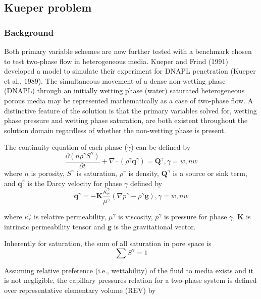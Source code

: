 \subsection{Kueper problem}
\subsubsection*{Background}
Both primary variable schemes are now further tested with a benchmark chosen to test two-phase flow in heterogeneous media. Kueper and Frind (1991) developed a model to simulate their experiment for DNAPL penetration (Kueper et al., $1989$). The simultaneous movement of a dense non-wetting phase (DNAPL) through an initially wetting phase (water) saturated heterogeneous porous media may be represented mathematically as a case of two-phase flow. A distinctive feature of the solution is that the primary variables solved for, wetting phase pressure and wetting phase saturation, are both existent throughout the solution domain regardless of whether the non-wetting phase is present.


The continuity equation of each phase ($\gamma$) can be defined by
\begin{equation}
\frac{\partial (n {\rho}^{\gamma} S^{\gamma})}{\partial t} + \nabla \cdot ({\rho}^{\gamma} \mathbf{q}^{\gamma}) = \mathbf{Q}^{\gamma}, \gamma=w, nw
\label{eq:mcwtMassEq}
\end{equation}
where $n$ is porosity, $S^{\gamma}$ is saturation, $\rho^{\gamma}$ is density, $\mathbf{Q}^{\gamma}$ is a source or sink term, and $\mathbf{q}^{\gamma}$ is the Darcy velocity for phase $\gamma$ defined by
\begin{equation}
\mathbf{q}^{\gamma}=-{\mathbf K} \frac{\kappa_r^{\gamma}}{\mu^{\gamma}}(\nabla p^{\gamma}-{\rho}^{\gamma} \mathbf{g}), \gamma=w, nw
\label{eq:mcwtFluxEq}
\end{equation}

where $\kappa_r^{\gamma}$ is relative permeability, $\mu^{\gamma}$ is viscosity, $p^{\gamma}$ is pressure for phase $\gamma$, $\textbf{K}$ is intrinsic permeability tensor and $\mathbf{g}$ is the gravitational vector.  

Inherently for saturation, the sum of all saturation in pore space is
\begin{equation}
{\sum S^{\gamma}}=1
\label{eq:mcwtFluxEq}
\end{equation}

Assuming relative preference (i.e., wettability) of the fluid to media exists and it is not negligible, the capillary pressures relation for a two-phase system is defined over representative elementary volume (REV) by 

